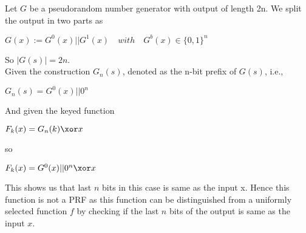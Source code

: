 Let $G$ be a pseudorandom number generator with output of length 2n. We split the output in two 
parts as 
\begin{center}
    $ G(x) := G^0(x) || G^1(x) \quad with \quad G^b(x) \in \{0,1\}^n $
\end{center}


So $ |G(s)| = 2n $.\\


Given the construction $ G_n(s) $, denoted as the n-bit prefix of $ G(s)$, i.e.,
\begin{center}
    $ G_n(s) =   G^0(x) || 0^n $
\end{center}

And given the keyed function
\begin{center}
    $ F_k(x) =   G_n(k) \xor x $
\end{center}

so
\begin{center}
    $ F_k(x) =   G^0(x) || 0^n \xor x $
\end{center}


This shows us that last $n$ bits in this case is same as the input x. Hence this function is not a PRF as this function can 
be distinguished from a uniformly selected function $f$ by checking if the last $n$ bits of
the output is same as the input $x$.
